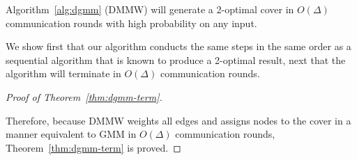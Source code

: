 \begin{thm}
  Algorithm~\ref{alg:dgmm} (DMMW) will generate a 2-optimal cover in $O(\Delta)$ communication rounds with high probability on any input.
\label{thm:dgmm-term}
\end{thm}
\begin{smy}
We show first that our algorithm conducts the same steps in the same order as a sequential algorithm that is known to produce a 2-optimal result, next that the algorithm will terminate in $O(\Delta)$ communication rounds.
\end{smy} 


\begin{proof}[Proof of Theorem~\ref{thm:dgmm-term}]
\label{prf:correct}




Therefore, because DMMW weights all edges and assigns nodes to the cover in a manner equivalent to GMM in $O(\Delta)$ communication rounds, Theorem~\ref{thm:dgmm-term} is proved.
\end{proof}
